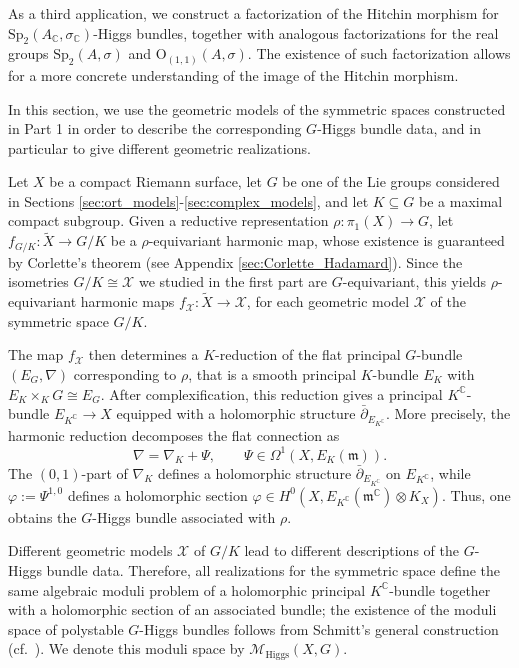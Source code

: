 \documentclass[oneside,11pt]{amsart}
\makeatletter
\theoremstyle{definition}
\theoremstyle{remark}
\let\origsection\section
\renewcommand\section{\@ifstar{\starsection}{\nostarsection}}
\newcommand\nostarsection[1]
{\sectionprelude\origsection{#1}\sectionpostlude}
\newcommand\starsection[1]
{\sectionprelude\origsection*{#1}\sectionpostlude}
\newcommand\sectionprelude{%
  \vspace{1em}
}
\newcommand\sectionpostlude{%
  \vspace{1em}
}
\numberwithin{thm}{section}
\numberwithin{equation}{section}
\makeatother
\begin{document}
As a third application, we construct a factorization of the
Hitchin morphism for $\mathrm{Sp}_2(A_{\mathbb C},\sigma_{\mathbb C})$-Higgs bundles, together with analogous factorizations for the real groups $\mathrm{Sp}_2(A,\sigma)$ and $\mathrm{O}_{(1,1)}(A,\sigma)$. The existence of such factorization allows for a more concrete understanding of the image of the Hitchin morphism.

\section{Higgs bundle data}\label{sec:Higgs-Data}


In this section, we use the geometric models of the symmetric spaces constructed in Part 1 in order to describe the corresponding $G$-Higgs bundle data, and in particular to give different geometric realizations.  

Let $X$ be a compact Riemann surface, let $G$ be one of the Lie groups considered in Sections \ref{sec:ort_models}-\ref{sec:complex_models}, and let $K\subseteq G$ be a maximal compact subgroup. Given a reductive representation
$\rho:\pi_1(X)\longrightarrow G
$, let $
f_{G/K}:\widetilde X\longrightarrow G/K
$ be a $\rho$-equivariant harmonic map, whose existence is guaranteed by Corlette’s theorem (see Appendix \ref{sec:Corlette_Hadamard}). Since the isometries $G/K \cong \mathcal{X}$ we studied in the first part are $G$-equivariant, this yields $\rho$-equivariant harmonic maps $
f_{\mathcal X}:\widetilde X\longrightarrow \mathcal{X}
$, for each geometric model $\mathcal X$ of the symmetric space $G/K$.

The map $f_{\mathcal{X}}$ then determines a $K$-reduction of the flat principal $G$-bundle $(E_G,\nabla)$ corresponding to $\rho$, that is a smooth principal $K$-bundle $E_K$ with $E_K\times_KG\cong E_G$. After complexification, this reduction gives a principal $K^{\mathbb C}$-bundle 
$E_{K^{\mathbb C}} \to X$ equipped with a holomorphic structure $\bar{\partial}_{E_{K^{\mathbb{C}}}}$.  More precisely, the harmonic reduction decomposes the flat connection as
\[
\nabla=\nabla_K+\Psi,
\qquad
\Psi\in\Omega^1(X,E_K(\mathfrak m)).
\]
The $(0,1)$-part of $\nabla_K$ defines a holomorphic structure $\bar{\partial}_{E_{K^{\mathbb{C}}}}$ on $E_{K^{\mathbb C}}$, while $\varphi:=\Psi^{1,0}$
defines a holomorphic section
$\varphi\in H^0(X,E_{K^{\mathbb C}}(\mathfrak m^{\mathbb C})\otimes K_X)$.
Thus, one obtains the \(G\)-Higgs bundle associated with \(\rho\).

Different geometric models $\mathcal X$ of $G/K$ lead to different descriptions of the
$G$-Higgs bundle data. Therefore, all realizations for the symmetric space define the same algebraic moduli problem of a holomorphic principal $K^{\mathbb C}$-bundle together with a holomorphic section of an associated bundle; the existence of the moduli space
of polystable $G$-Higgs bundles follows from Schmitt's general construction  (cf.~\cite[Section 2.7]{Schmitt}). We
denote this moduli space by
$\mathcal M_{\mathrm{Higgs}}(X,G)$.
\end{document}
